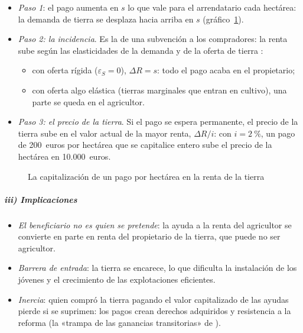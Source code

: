 \documentclass[11pt]{article}
\begin{document}
\begin{itemize}
\item \emph{Paso 1}: el pago aumenta en $s$ lo que vale para el arrendatario cada hectárea: la demanda de tierra se desplaza hacia arriba en $s$ (gráfico~\ref{fig:capitalizacion}).
\item \emph{Paso 2: la incidencia}. Es la de una subvención a los compradores: la renta sube según las elasticidades de la demanda y de la oferta de tierra\nocite{Kirwan2009Incidence} :
  \begin{itemize}
  \item con oferta rígida ($\varepsilon_S=0$), $\Delta R=s$: todo el pago acaba en el propietario;
  \item con oferta algo elástica (tierras marginales que entran en cultivo), una parte se queda en el agricultor.
  \end{itemize}
\item \emph{Paso 3: el precio de la tierra}. Si el pago se espera permanente, el precio de la tierra sube en el valor actual de la mayor renta, $\Delta R/i$: con $i=2~\%$, un pago de 200~euros por hectárea que se capitalice entero sube el precio de la hectárea en 10.000~euros.
\end{itemize}

\begin{figure}[H]
\centering
\caption{La capitalización de un pago por hectárea en la renta de la tierra}\label{fig:capitalizacion}
\end{figure}

\subparagraph{iii) Implicaciones}

\begin{itemize}
\item \emph{El beneficiario no es quien se pretende}: la ayuda a la renta del agricultor se convierte en parte en renta del propietario de la tierra, que puede no ser agricultor.
\item \emph{Barrera de entrada}: la tierra se encarece, lo que dificulta la instalación de los jóvenes y el crecimiento de las explotaciones eficientes.
\item \emph{Inercia}: quien compró la tierra pagando el valor capitalizado de las ayudas pierde si se suprimen: los pagos crean derechos adquiridos y resistencia a la reforma (la «trampa de las ganancias transitorias» de )\nocite{Tullock1975Transitional}.
\end{itemize}
\end{document}
